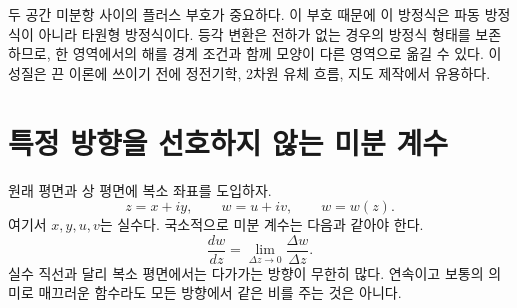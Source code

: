 두 공간 미분항 사이의 플러스 부호가 중요하다. 이 부호 때문에 이 방정식은 파동 방정식이 아니라 타원형 방정식이다. 등각 변환은 전하가 없는 경우의 방정식 형태를 보존하므로, 한 영역에서의 해를 경계 조건과 함께 모양이 다른 영역으로 옮길 수 있다. 이 성질은 끈 이론에 쓰이기 전에 정전기학, 2차원 유체 흐름, 지도 제작에서 유용하다.

\begin{classroomqa}
\end{classroomqa}

\begin{classroomqa}
\end{classroomqa}

\section{특정 방향을 선호하지 않는 미분 계수}

원래 평면과 상 평면에 복소 좌표를 도입하자.
\begin{equation}
  z=x+iy,
  \qquad
  w=u+iv,
  \qquad
  w=w(z).
  \label{eq:l08-complex-coordinates}
\end{equation}
여기서 \(x,y,u,v\)는 실수다. 국소적으로 미분 계수는 다음과 같아야 한다.
\begin{equation}
  \frac{dw}{dz}
  =\lim_{\Delta z\to0}\frac{\Delta w}{\Delta z}.
  \label{eq:l08-complex-derivative}
\end{equation}
실수 직선과 달리 복소 평면에서는 다가가는 방향이 무한히 많다. 연속이고 보통의 의미로 매끄러운 함수라도 모든 방향에서 같은 비를 주는 것은 아니다.

